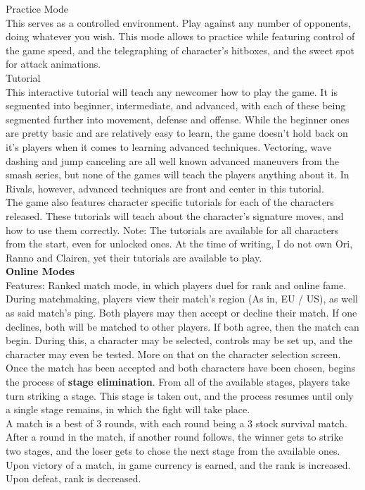 \documentclass[11pt]{article}
\begin{document}
Practice Mode\\
This serves as a controlled environment. Play against any number of opponents, doing whatever you wish. This mode allows to practice while featuring control of the game speed, and the telegraphing of character's hitboxes, and the sweet spot for attack animations.\\

Tutorial\\
This interactive tutorial will teach any newcomer how to play the game. It is segmented into beginner, intermediate, and advanced, with each of these being segmented further into movement, defense and offense. While the beginner ones are pretty basic and are relatively easy to learn, the game doesn't hold back on it's players when it comes to learning advanced techniques. Vectoring, wave dashing and jump canceling are all well known advanced maneuvers from the smash series, %
but none of the games will teach the players anything about it. In Rivals, however, advanced techniques are front and center in this tutorial.\\
The game also features character specific tutorials for each of the characters released. These tutorials will teach about the character's signature moves, and how to use them correctly. Note: The tutorials are available for all characters from the start, even for unlocked ones. At the time of writing, I do not own Ori, Ranno and Clairen, yet their tutorials are available to play.\\

\textbf{Online Modes}\\
Features: Ranked match mode, in which players duel for rank and online fame. During matchmaking, players view their match's region (As in, EU / US), as well as said match's ping. Both players may then accept or decline their match. If one declines, both will be matched to other players. If both agree, then the match can begin. During this, a character may be selected, controls may be set up, and the character may even be tested. More on that on the character selection screen.\\
Once the match has been accepted and both characters have been chosen, begins the process of \textbf{stage elimination}. From all of the available stages, players take turn striking a stage. This stage is taken out, and the process resumes until only a single stage remains, in which the fight will take place.\\
A match is a best of 3 rounds, with each round being a 3 stock survival match. After a round in the match, if another round follows, the winner gets to strike two stages, and the loser gets to chose the next stage from the available ones.\\
Upon victory of a match, in game currency is earned, and the rank is increased. Upon defeat, rank is decreased.\\
\end{document}
